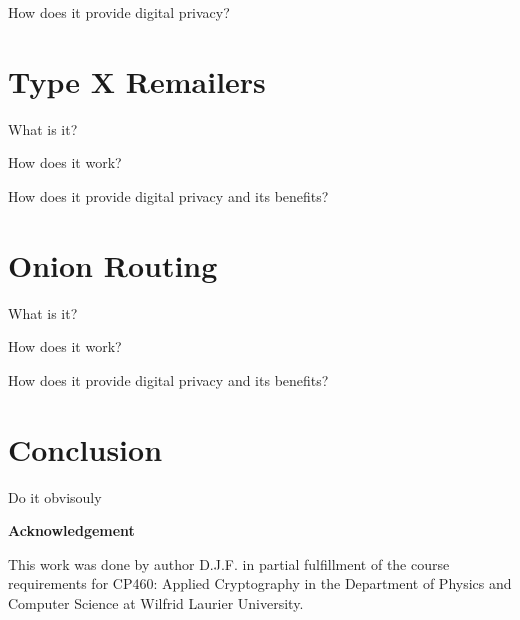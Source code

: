 \documentclass[12pt]{article}
\begin{document}
How does it provide digital privacy?



\section{Type X Remailers}\label{sec:type-x}
What is it?

How does it work?

How does it provide digital privacy and its benefits?


\section{Onion Routing}\label{}
What is it?

How does it work?

How does it provide digital privacy and its benefits?

\section{Conclusion}\label{sec:conclusion}
Do it obvisouly

\begin{center}
{\bf Acknowledgement}
\end{center}
This work was done by author D.J.F. in partial fulfillment of the course requirements for CP460: Applied Cryptography in the Department of Physics and Computer Science at Wilfrid Laurier University.
\end{document}

